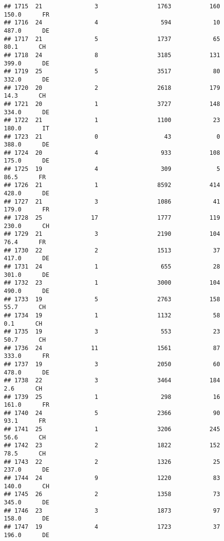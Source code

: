 \documentclass[
]{article}
\begin{document}
\begin{verbatim}
## 1715  21               3                 1763           160    150.0      FR
## 1716  24               4                  594            10    487.0      DE
## 1717  21               5                 1737            65     80.1      CH
## 1718  24               8                 3185           131    399.0      DE
## 1719  25               5                 3517            80    332.0      DE
## 1720  20               2                 2618           179     14.3      CH
## 1721  20               1                 3727           148    334.0      DE
## 1722  21               1                 1100            23    180.0      IT
## 1723  21               0                   43             0    388.0      DE
## 1724  20               4                  933           108    175.0      DE
## 1725  19               4                  309             5     86.5      FR
## 1726  21               1                 8592           414    428.0      DE
## 1727  21               3                 1086            41    179.0      FR
## 1728  25              17                 1777           119    230.0      CH
## 1729  21               3                 2190           104     76.4      FR
## 1730  22               2                 1513            37    417.0      DE
## 1731  24               1                  655            28    301.0      DE
## 1732  23               1                 3000           104    490.0      DE
## 1733  19               5                 2763           158     55.7      CH
## 1734  19               1                 1132            58      0.1      CH
## 1735  19               3                  553            23     50.7      CH
## 1736  24              11                 1561            87    333.0      FR
## 1737  19               3                 2050            60    478.0      DE
## 1738  22               3                 3464           184      2.6      CH
## 1739  25               1                  298            16    161.0      FR
## 1740  24               5                 2366            90     93.1      FR
## 1741  25               1                 3206           245     56.6      CH
## 1742  23               2                 1822           152     78.5      CH
## 1743  22               2                 1326            25    237.0      DE
## 1744  24               9                 1220            83    140.0      CH
## 1745  26               2                 1358            73    345.0      DE
## 1746  23               3                 1873            97    158.0      DE
## 1747  19               4                 1723            37    196.0      DE

\end{verbatim}
\end{document}
